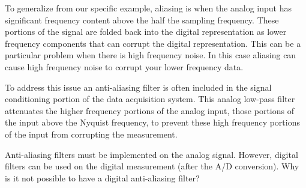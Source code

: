 To generalize from our specific example, aliasing is when the analog input has significant frequency content above the half the sampling frequency.  These portions of the signal are folded back into the digital representation as lower frequency components that can corrupt the digital representation.  This can be a particular problem when there is high frequency noise.  In this case aliasing can cause high frequency noise to corrupt your lower frequency data.

To address this issue an anti-aliasing filter is often included in the signal conditioning portion of the data acquisition system.  This analog low-pass filter attenuates the higher frequency portions of the analog input, those portions of the input above the Nyquist frequency, to prevent these high frequency portions of the input from corrupting the measurement.

\begin{ex}
Anti-aliasing filters must be implemented on the analog signal.  However, digital filters can be used on the digital measurement (after the A/D conversion).  Why is it not possible to have a digital anti-aliasing filter?
\end{ex}



